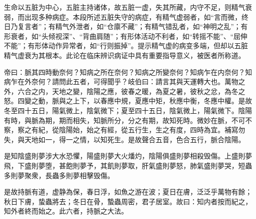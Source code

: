 \documentclass[12pt]{ctexbook}
\begin{document}


生命以五脏为中心，五脏主持诸体，故五脏一虚，失其所藏，内守不足，则精气衰弱，而出现多种病症。本段所述五脏失守的病症，有精气虚弱者，如“言而微，终日乃复言者”；有精气外泄者，如“仓廪不藏”；有精气错乱者，如“神明之乱”；有形衰者，如“头倾视深”、“背曲肩随”；有形体活动不利者，如“转摇不能”、“屈伸不能”；有形体动作异常者，如“行则振掉”。提示精气虚的病变多端，但却以五脏精气虚衰为其根本。此论在临床辨识病证中具有重要指导意义，被医者所称道。


\begin{yuanwen}
帝曰：脈其四時動奈何？知病之所在奈何？知病之所變奈何？知病乍在内奈何？知病乍在外奈何？請問此五者，可得聞乎？岐伯曰：請言其與天運轉大也。萬物之外，六合之内，天地之變，陰陽之應，彼春之暖，為夏之暑，彼秋之忿，為冬之怒。四變之動，脈與之上下，以春應中規，夏應中矩，秋應中衡，冬應中權。是故冬至四十五日，陽氣微上，陰氣微下；夏至四十五日，陰氣微上，陽氣微下。陰陽有時，與脈為期，期而相失，知脈所分，分之有期，故知死時。微妙在脈，不可不察，察之有紀，從陰陽始，始之有經，從五行生，生之有度，四時為宜。補寫勿失，與天地如一，得一之情，以知死生。是故聲合五音，色合五行，脈合陰陽。

是知陰盛則夢涉大水恐懼，陽盛則夢大火燔灼，陰陽俱盛則夢相殺毁傷。上盛則夢飛，下盛則夢堕，甚飽則夢予，其飢則夢取，肝氣盛則夢怒，肺氣盛則夢哭，短蟲多則夢聚衆，長蟲多則夢相擊毁傷。

是故持脈有道，虚静為保，春日浮，如魚之游在波；夏日在膚，泛泛乎萬物有餘；秋日下膚，蛰蟲將去；冬日在骨，蟄蟲周密，君子居室。故曰：知内者按而紀之，知外者終而始之。此六者，持脈之大法。
\end{yuanwen}

\end{document}
